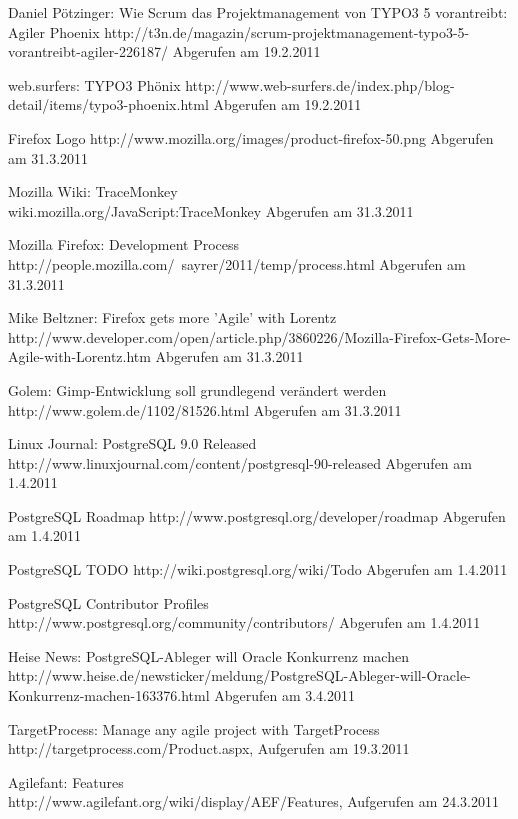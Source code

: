 \documentclass[german,english]{header}
\begin{document}
\begin{thebibliography}{5}
Daniel Pötzinger:
Wie Scrum das Projektmanagement von TYPO3 5 vorantreibt: Agiler Phoenix
http://t3n.de/magazin/scrum-projektmanagement-typo3-5-vorantreibt-agiler-226187/ Abgerufen am 19.2.2011

web.surfers:
TYPO3 Phönix
http://www.web-surfers.de/index.php/blog-detail/items/typo3-phoenix.html Abgerufen am 19.2.2011

Firefox Logo
http://www.mozilla.org/images/product-firefox-50.png Abgerufen am 31.3.2011


Mozilla Wiki:
TraceMonkey
\\wiki.mozilla.org/JavaScript:TraceMonkey Abgerufen am 31.3.2011

Mozilla Firefox: Development Process
http://people.mozilla.com/~sayrer/2011/temp/process.html Abgerufen am 31.3.2011

Mike Beltzner:
Firefox gets more 'Agile' with Lorentz
\\http://www.developer.com/open/article.php/3860226/Mozilla-Firefox-Gets-More-Agile-with-Lorentz.htm Abgerufen am 31.3.2011

Golem: Gimp-Entwicklung soll grundlegend verändert werden
http://www.golem.de/1102/81526.html Abgerufen am 31.3.2011

Linux Journal:
PostgreSQL 9.0 Released
http://www.linuxjournal.com/content/postgresql-90-released Abgerufen am 1.4.2011

PostgreSQL Roadmap
http://www.postgresql.org/developer/roadmap Abgerufen am 1.4.2011

PostgreSQL TODO
http://wiki.postgresql.org/wiki/Todo Abgerufen am 1.4.2011

PostgreSQL Contributor Profiles
http://www.postgresql.org/community/contributors/ Abgerufen am 1.4.2011

Heise News:
PostgreSQL-Ableger will Oracle Konkurrenz machen
http://www.heise.de/newsticker/meldung/PostgreSQL-Ableger-will-Oracle-Konkurrenz-machen-163376.html Abgerufen am 3.4.2011

TargetProcess: Manage any agile project with TargetProcess\\
http://targetprocess.com/Product.aspx,
Aufgerufen am 19.3.2011

Agilefant: Features\\ 
http://www.agilefant.org/wiki/display/AEF/Features,
Aufgerufen am 24.3.2011


\end{thebibliography}
\end{document}
